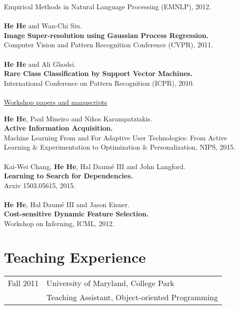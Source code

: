 \documentclass[a4paper,11pt]{article}
\begin{document}
Empirical Methods in Natural Language Processing (EMNLP), 2012.\\
\\
{\bf He He} and Wan-Chi Siu. \\
{\bf Image Super-resolution using Gaussian Process Regression.}\\
Computer Vision and Pattern Recognition Conference (CVPR), 2011.\\
\\
{\bf He He} and Ali Ghodsi. \\
{\bf Rare Class Classification by Support Vector Machines.}\\
International Conference on Pattern Recognition (ICPR), 2010.\\
\\
{\underline{Workshop papers and manuscripts}}

{\bf He He}, Paul Mineiro and Nikos Karampatziakis. \\
{\bf Active Information Acquisition.}\\
Machine Learning From and For Adaptive User Technologies: From Active Learning \& Experimentation to Optimization \& Personalization, NIPS, 2015.\\
\\
Kai-Wei Chang, {\bf He He}, Hal Daum\'e III and John Langford.\\
{\bf Learning to Search for Dependencies.}\\
Arxiv 1503.05615, 2015.\\
\\
{\bf He He}, Hal Daum\'e III and Jason Eisner.\\
{\bf Cost-sensitive Dynamic Feature Selection.}\\
Workshop on Inferning, ICML, 2012.

\section{Teaching Experience} 
\begin{tabular}{rl}
Fall 2011 & University of Maryland, College Park\\
& Teaching Assistant, Object-oriented Programming
\end{tabular}
\end{document}
